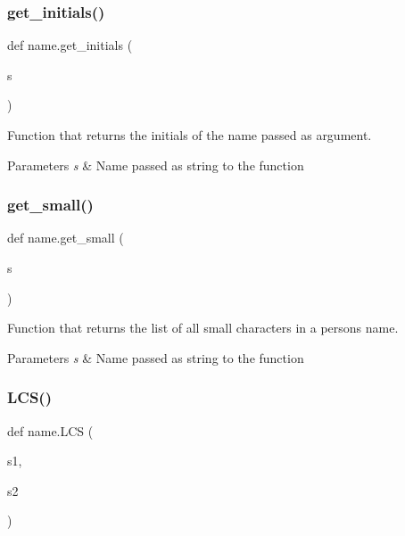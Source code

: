 \subsubsection{\texorpdfstring{get\+\_\+initials()}{get\_initials()}}
{\footnotesize\ttfamily def name.\+get\+\_\+initials (\begin{DoxyParamCaption}\item[{}]{s }\end{DoxyParamCaption})}



Function that returns the initials of the name passed as argument. 


\begin{DoxyParams}{Parameters}
{\em s} & Name passed as string to the function \\
\hline
\end{DoxyParams}
\mbox{\label{namespacename_aea030be0c4aba39c00144f53b219b5fb}} 
\subsubsection{\texorpdfstring{get\+\_\+small()}{get\_small()}}
{\footnotesize\ttfamily def name.\+get\+\_\+small (\begin{DoxyParamCaption}\item[{}]{s }\end{DoxyParamCaption})}



Function that returns the list of all small characters in a person\textquotesingle{}s name. 


\begin{DoxyParams}{Parameters}
{\em s} & Name passed as string to the function \\
\hline
\end{DoxyParams}
\mbox{\label{namespacename_a662ec0d5b529dcd09fe92f4011739422}} 
\subsubsection{\texorpdfstring{L\+C\+S()}{LCS()}}
{\footnotesize\ttfamily def name.\+L\+CS (\begin{DoxyParamCaption}\item[{}]{s1,  }\item[{}]{s2 }\end{DoxyParamCaption})}



